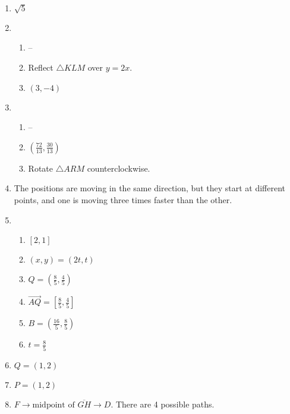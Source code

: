 \documentclass{article}
\begin{document}
\begin{enumerate}
\begin{enumerate}
	\end{enumerate}
	
\item $\sqrt{5}$

\item

	\begin{enumerate}
	
	\item --
	
	\item Reflect $\triangle KLM$ over $y = 2x$.
	
	\item $(3, -4)$
	
	\end{enumerate}
	
\item

	\begin{enumerate}
	
	\item --
	
	\item $(\frac{72}{13}, \frac{30}{13})$
	
	\item Rotate $\triangle ARM$ counterclockwise.
	
	\end{enumerate}
	
\item The positions are moving in the same direction, but they start at different points, and one is moving three times faster than the other.

\item

	\begin{enumerate}
	
	\item $[2, 1]$
	
	\item $(x, y) = (2t, t)$
	
	\item $Q = (\frac{8}{5}, \frac{4}{5})$
	
	\item $\overrightarrow{AQ} = [\frac{8}{5}, \frac{4}{5}]$
	
	\item $B = (\frac{16}{5}, \frac{8}{5})$
	
	\item $t = \frac{8}{5}$
	
	\end{enumerate}
	
\item $Q = (1, 2)$

\item $P = (1, 2)$

\item $F \rightarrow \text{midpoint of } \overline{GH} \rightarrow D$. There are 4 possible paths.

\end{enumerate}
\end{document}
